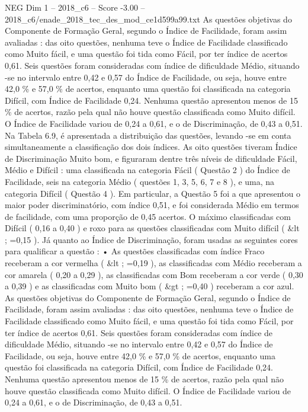 \begin{textsample}{NEG Dim 1 – 2018\_c6 – Score -3.00 – 2018\_c6/enade\_2018\_tec\_des\_mod\_ce1d599a99.txt}
As questões objetivas do Componente de Formação Geral, segundo o Índice de Facilidade, foram assim avaliadas : das oito questões, nenhuma teve o Índice de Facilidade classificado como Muito fácil, e uma questão foi tida como Fácil, por ter índice de acertos 0,61.
Seis questões foram consideradas com índice de dificuldade Médio, situando -se no intervalo entre 0,42 e 0,57 do Índice de Facilidade, ou seja, houve entre 42,0 \% e 57,0 \% de acertos, enquanto uma questão foi classificada na categoria Difícil, com Índice de Facilidade 0,24.
Nenhuma questão apresentou menos de 15 \% de acertos, razão pela qual não houve questão classificada como Muito difícil.
O Índice de Facilidade variou de 0,24 a 0,61, e o de Discriminação, de 0,43 a 0,51.
Na Tabela 6.9, é apresentada a distribuição das questões, levando -se em conta simultaneamente a classificação dos dois índices.
As oito questões tiveram Índice de Discriminação Muito bom, e figuraram dentre três níveis de dificuldade Fácil, Médio e Difícil : uma classificada na categoria Fácil ( Questão 2 ) do Índice de Facilidade, seis na categoria Médio ( questões 1, 3, 5, 6, 7 e 8 ), e uma, na categoria Difícil ( Questão 4 ).
Em particular, a Questão 5 foi a que apresentou o maior poder discriminatório, com índice 0,51, e foi considerada Médio em termos de facilidade, com uma proporção de 0,45 acertos.
O máximo classificadas com Difícil ( 0,16 a 0,40 ) e roxo para as questões classificadas com Muito difícil ( \&lt ; =0,15 ).
Já quanto ao Índice de Discriminação, foram usadas as seguintes cores para qualificar a questão : • As questões classificadas com índice Fraco receberam a cor vermelha ( \&lt ; =0,19 ), as classificadas com Médio receberam a cor amarela ( 0,20 a 0,29 ), as classificadas com Bom receberam a cor verde ( 0,30 a 0,39 ) e as classificadas com Muito bom ( \&gt ; =0,40 ) receberam a cor azul.
As questões objetivas do Componente de Formação Geral, segundo o Índice de Facilidade, foram assim avaliadas : das oito questões, nenhuma teve o Índice de Facilidade classificado como Muito fácil, e uma questão foi tida como Fácil, por ter índice de acertos 0,61.
Seis questões foram consideradas com índice de dificuldade Médio, situando -se no intervalo entre 0,42 e 0,57 do Índice de Facilidade, ou seja, houve entre 42,0 \% e 57,0 \% de acertos, enquanto uma questão foi classificada na categoria Difícil, com Índice de Facilidade 0,24.
Nenhuma questão apresentou menos de 15 \% de acertos, razão pela qual não houve questão classificada como Muito difícil.
O Índice de Facilidade variou de 0,24 a 0,61, e o de Discriminação, de 0,43 a 0,51.

\end{textsample}
